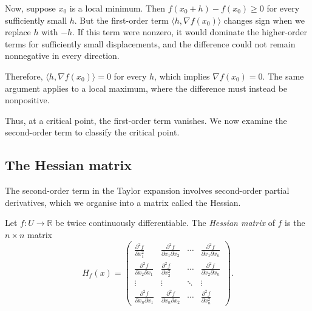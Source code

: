 Now, suppose $x_0$ is a local minimum. Then $f(x_0+h)-f(x_0)\geq 0$ for every sufficiently small $h$. But the first-order term $\langle h,\nabla f(x_0)\rangle$ changes sign when we replace $h$ with $-h$. If this term were nonzero, it would dominate the higher-order terms for sufficiently small displacements, and the difference could not remain nonnegative in every direction.

Therefore, $\langle h,\nabla f(x_0)\rangle=0$ for every $h$, which implies $\nabla f(x_0)=0$. The same argument applies to a local maximum, where the difference must instead be nonpositive.

Thus, at a critical point, the first-order term vanishes. We now examine the second-order term to classify the critical point.

\subsection{The Hessian matrix}

The second-order term in the Taylor expansion involves second-order partial derivatives, which we organise into a matrix called the Hessian.

\begin{definition}
	Let $f:U\to\mathbb{R}$ be twice continuously differentiable. The \emph{Hessian matrix} of $f$ is the $n\times n$ matrix
	\begin{equation}
		H_f(x)=
		\begin{pmatrix}
			\frac{\partial^2f}{\partial x_1^2}           &
			\frac{\partial^2f}{\partial x_1\partial x_2} &
			\cdots                                       &
			\frac{\partial^2f}{\partial x_1\partial x_n}                            \\[6pt]
			\frac{\partial^2f}{\partial x_2\partial x_1} &
			\frac{\partial^2f}{\partial x_2^2}           &
			\cdots                                       &
			\frac{\partial^2f}{\partial x_2\partial x_n}                            \\
			\vdots                                       & \vdots & \ddots & \vdots \\[6pt]
			\frac{\partial^2f}{\partial x_n\partial x_1} &
			\frac{\partial^2f}{\partial x_n\partial x_2} &
			\cdots                                       &
			\frac{\partial^2f}{\partial x_n^2}
		\end{pmatrix}.
		\label{eq:hessian-matrix}
	\end{equation}
\end{definition}

